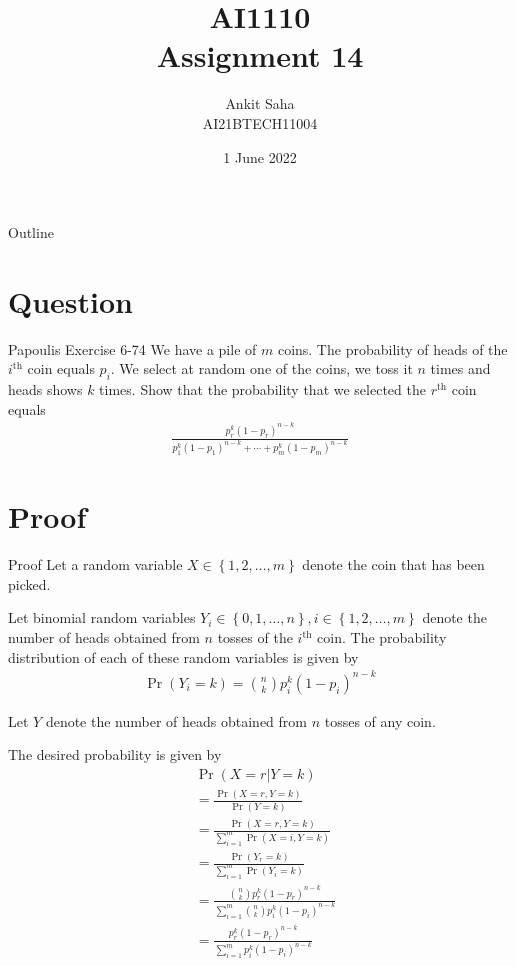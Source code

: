 \documentclass{beamer}
\title{AI1110 \\ Assignment 14}
\author{Ankit Saha \\ AI21BTECH11004}
\date{1 June 2022}
\providecommand{\pr}[1]{\ensuremath{\Pr\left(#1\right)}}
\providecommand{\cbrak}[1]{\ensuremath{\left\{#1\right\}}}
\begin{document}
	\begin{frame}
		\titlepage
	\end{frame}
	
	\begin{frame}{Outline}
    		\tableofcontents
	\end{frame}
	
	\section{Question}
	\begin{frame}{Papoulis Exercise 6-74}
	We have a pile of $m$ coins. The probability of heads of the $i^{\mathrm{th}}$ coin equals $p_i$. We select at random one of the coins, we toss it $n$ times and heads shows $k$ times. Show that the probability that we selected the $r^{\mathrm{th}}$ coin equals
	\begin{align}
		\frac{p_r^k (1-p_r)^{n-k}}{p_1^k (1-p_1)^{n-k} + \cdots + p_m^k (1-p_m)^{n-k}}
	\end{align}
	\end{frame}
	
	\section{Proof}
	\begin{frame}{Proof}
		Let a random variable $X \in \cbrak{1, 2, \ldots, m}$ denote the coin that has been picked. 
		
		Let binomial random variables $Y_i \in \cbrak{0,1,\ldots,n}, i \in \cbrak{1, 2, \ldots, m}$ denote the number of heads obtained from $n$ tosses of the $i^{\mathrm{th}}$ coin. The probability distribution of each of these random variables is given by
		\begin{align}
			\pr{Y_i = k} = \binom{n}{k} p_i^k (1-p_i)^{n-k}
		\end{align}
		
		Let $Y$ denote the number of heads obtained from $n$ tosses of any coin.
	\end{frame}
		
	\begin{frame}
	The desired probability is given by
	\begin{align}
		&\pr{X = r | Y = k} \\
		&= \frac{\pr{X=r,Y=k}}{\pr{Y=k}} \\
		&= \frac{\pr{X=r,Y=k}}{\sum_{i=1}^m \pr{X=i,Y=k}} \\
		&= \frac{\pr{Y_r=k}}{\sum_{i=1}^m \pr{Y_i=k}} \\
		&= \frac{\binom{n}{k} p_r^k (1-p_r)^{n-k}}{\sum_{i=1}^m \binom{n}{k} p_i^k (1-p_i)^{n-k}} \\
		&= \frac{p_r^k (1-p_r)^{n-k}}{\sum_{i=1}^m p_i^k (1-p_i)^{n-k}}
	\end{align}
	\end{frame}
	
\end{document}
